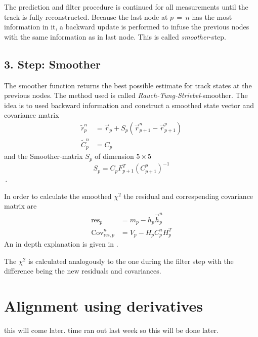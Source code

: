 The prediction and filter procedure is continued for all measurements until the track is fully reconstructed.
Because the last node at $p \, = \, n$ has the most information in it, a backward update is performed to infuse the previous nodes with the same information as in last node.
This is called \textit{smoother}-step.

\subsection{3. Step: Smoother}
The smoother function returns the best possible estimate for track states at
the previous nodes. The method used is called \textit{Rauch-Tung-Striebel}-smoother.
The idea is to used backward information and construct a smoothed state vector and covariance matrix
\begin{align}
  \tilde{r}_p^n &= \vec{r}_p + S_p \left( \vec{r}_{p+1}^n - \vec{r}_{p+1}^p \right) \\
  \tilde{C}_p^n &= C_p
\end{align}
and the Smoother-matrix $S_p$ of dimension $5\times5$
\begin{equation}
  S_p = C_p F_{p+1}^T \left( C_{p+1}^p \right)^{-1}
\end{equation}\,.

In order to calculate the smoothed $\chi^2$ the residual and correspending covariance matrix are
\begin{align}
  \text{res}_p &= m_p - h_p \vec{h}_p^n \\
  \text{Cov}_{\text{res},p}^n &= V_p - H_p C_p^n H_p^T
\end{align}
An in depth explanation is given in \cite{RTS}.

The $\chi^2$ is calculated analogously to the one during the filter step with the difference being the new residuals and covariances.

\section{Alignment using derivatives}
\label{sec:derivatives}

this will come later. time ran out last week so this will be done later.


%
%
%
%

